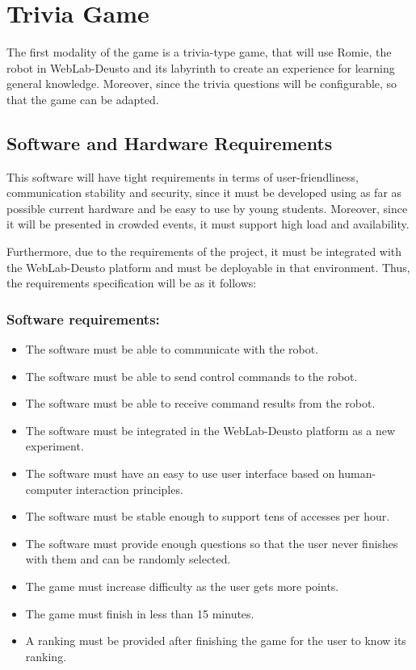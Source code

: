 \section{Trivia Game}

The first modality of the game is a trivia-type game, that will use Romie, the robot in
WebLab-Deusto and its labyrinth to create an experience for learning general knowledge. Moreover,
since the trivia questions will be configurable, so that the game can be adapted.

\subsection{Software and Hardware Requirements}

This software will have tight requirements in terms of user-friendliness, communication stability
and security, since it must be developed using as far as possible current hardware and be easy to
use by young students. Moreover, since it will be presented in crowded events, it must support high
load and availability.

Furthermore, due to the requirements of the project, it must be integrated with the WebLab-Deusto
platform and must be deployable in that environment. Thus, the requirements specification will be
as it follows:

\subsubsection{Software requirements:}

\begin{itemize}
	\item The software must be able to communicate with the robot.
	\item The software must be able to send control commands to the robot.
	\item The software must be able to receive command results from the robot.
	\item The software must be integrated in the WebLab-Deusto platform as a new experiment.
	\item The software must have an easy to use user interface based on human-computer interaction
	principles.
	\item The software must be stable enough to support tens of accesses per hour.
	\item The software must provide enough questions so that the user never finishes with them and
	can be randomly selected.
	\item The game must increase difficulty as the user gets more points.
	\item The game must finish in less than 15 minutes.
	\item A ranking must be provided after finishing the game for the user to know its ranking.
\end{itemize}

